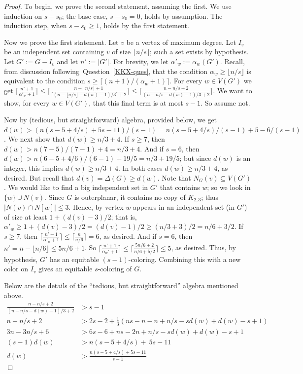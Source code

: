 \documentclass[11pt]{article}
\theoremstyle{definition}
\newcommand\floor[1]{\lfloor#1\rfloor}
\newcommand\ceil[1]{\lceil#1\rceil}
\renewcommand\ge\geqslant
\renewcommand\le\leqslant
\def\aftermath{\par\vspace{-\belowdisplayskip}\vspace{-\parskip}\vspace{-\baselineskip}}
\begin{document}
\begin{proof}
To begin, we prove the second statement, assuming the first.
We use induction on $s-s_0$; the base case, $s-s_0 = 0$, holds by assumption.
The induction step, when $s -s_0\ge 1$, holds by the first statement.  

Now we prove the first statement.
Let $v$ be a vertex of maximum degree.
Let $I_v$ be an independent set containing $v$ of size $\lfloor n/s\rfloor$; such a set exists by hypothesis.
Let $G':=G-I_v$ and let $n':=|G'|$.  For brevity, we let $\alpha'_{w}:=\alpha_{w}(G')$.
Recall, from discussion following~Question~\ref{KKX-ques}, that the condition $\alpha_w\ge \floor{n/s}$ is equivalent to the condition $s\ge\ceil{(n+1)/(\alpha_w+1)}$.
%
For every $w\in V(G')$ we get $\lceil\frac{n'+1}{\alpha'_w+1}\rceil \le 
\lceil\frac{n-\lfloor n/s\rfloor+1}{\lceil(n-\lfloor n/s\rfloor -d(w)-1)/3\rceil+2}\rceil\le \lceil\frac{n-n/s+2}{(n-n/s -d(w)-1)/3+2}\rceil$. 
We want to show, for every $w\in V(G')$, that this final term is at most $s-1$.  
So assume not. 

Now by (tedious, but straightforward) algebra, provided below, we 
get $d(w) > (n(s-5+4/s)+{5s-11})/(s-1) = n(s-5+4/s)/(s-1)+5-6/(s-1)$.  
We next show that $d(w) \ge n/3+4$.
If $s\ge 7$, then $d(w) > n(7-5)/(7-1)+4=n/3+4$. 
And if $s=6$, then $d(w) > n(6-5+4/6)/(6-1) + 19/5 = n/3+19/5$; but since $d(w)$ is an integer, this implies $d(w)\ge n/3+4$.  
In both cases $d(w) \ge n/3+4$, as desired.
But recall that $d(v) =\Delta (G) \ge d(w)$.
Note that $N_G(v)\subseteq V(G')$.
We would like to find a big independent set in $G'$ that contains $w$; so we look in $\{w\}\cup N(v)$.  Since $G$ is outerplanar, it contains no copy of $K_{2,3}$; thus $|N(v)\cap N[w]|\le 3$.  Hence, by  vertex
$w$ appears in an independent set (in $G'$) of size at least $1+(d(v)-3)/2$; that is, $\alpha'_w\ge 1 + (d(v)-3)/2 = (d(v)-1)/2 \ge (n/3+3)/2 = n/6+3/2$.  If $s\ge 7$, then
$\lceil\frac{n'+1}{\alpha'_w+1}\rceil\le \lceil\frac{n}{n/6}\rceil = 6$, as desired.
And if $s = 6$, then $n' = n-\lfloor n/6\rfloor \le 5n/6+1$.
So
$\lceil\frac{n'+1}{\alpha_w'+1}\rceil\le \lceil\frac{5n/6+2}{n/6+5/2}\rceil \le 5$, as desired.
Thus, by hypothesis, $G'$ has an equitable $(s-1)$-coloring.  
Combining this with a new color on $I_v$ gives an equitable $s$-coloring of $G$.

Below are the details of the ``tedious, but straightforward'' algebra mentioned above. 
\begin{align*}
\frac{n-n/s+2}{(n-n/s-d(w)-1)/3+2} &> s-1\\
n - n/s+2 &> 2s-2 + \frac13(ns-n-n+n/s-sd(w)+d(w)-s+1)\\
3n-3n/s+6 &> 6s-6 + ns -2n + n/s -sd(w) + d(w)-s+1\\
(s-1)d(w) &> n(s-5+4/s)+ {~5s-11}\\
d(w) &> \frac{n(s-5+4/s)+{5s-11}}{s-1}
\end{align*}
\aftermath
\end{proof}
\end{document}
